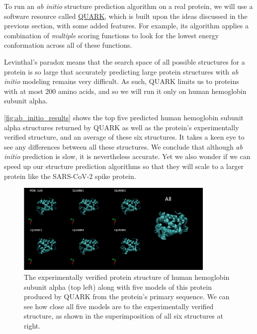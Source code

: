 To run an \textit{ab initio} structure prediction algorithm on a real protein, we will use a software resource called \href{https://zhanglab.ccmb.med.umich.edu/QUARK/}{QUARK}, which is built upon the ideas discussed in the previous section, with some added features. For example, its algorithm applies a combination of \textit{multiple} scoring functions to look for the lowest energy conformation across all of these functions.

Levinthal's paradox means that the search space of all possible structures for a protein is so large that accurately predicting large protein structures with \textit{ab initio} modeling remains very difficult. As such, QUARK limits us to proteins with at most 200 amino acids, and so we will run it only on human hemoglobin subunit alpha.

\autoref{fig:ab_initio_results} shows the top five predicted human hemoglobin subunit alpha structures returned by QUARK as well as the protein's experimentally verified structure, and an average of these six structures. It takes a keen eye to see any differences between all these structures. We conclude that although \textit{ab initio} prediction is slow, it is nevertheless accurate. Yet we also wonder if we can speed up our structure prediction algorithms so that they will scale to a larger protein like the SARS-CoV-2 spike protein.\\

\begin{figure}[h]
	\centering
	\mySfFamily
	\includegraphics[width = 0.85\textwidth]{../images/ab_initio_results.png}
	\caption{The experimentally verified protein structure of human hemoglobin subunit alpha (top left) along with five models of this protein produced by QUARK from the protein's primary sequence. We can see how close all five models are to the experimentally verified structure, as shown in the superimposition of all six structures at right.}
	\label{fig:ab_initio_results}
\end{figure}

